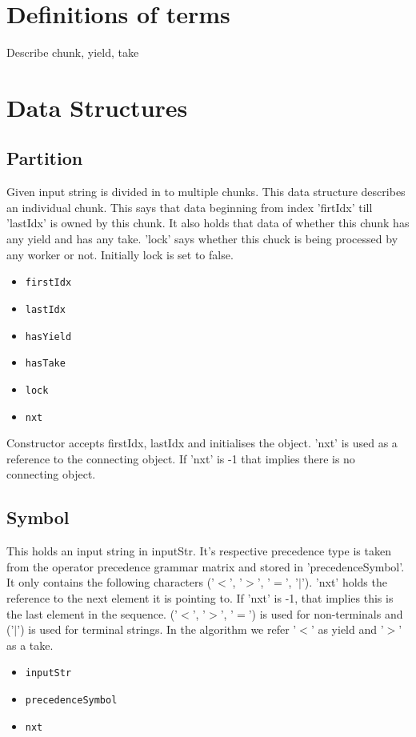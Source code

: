 \documentclass{article}
\begin{document}
 \begin{flushleft}

\section{Definitions of terms}
Describe chunk, yield, take

\section{Data Structures}

\subsection{Partition}

Given input string is divided in to multiple chunks. This data structure describes an individual chunk. This says that data beginning from index 'firtIdx' till 'lastIdx' is owned by this chunk. It also holds that data of whether this chunk has any yield and has any take. 'lock' says whether this chuck is being processed by any worker or not. Initially lock is set to false.
\BlankLine
	\begin{itemize}
		\item \texttt{firstIdx}
		\item \texttt{lastIdx}
		\item \texttt{hasYield}
		\item \texttt{hasTake}
		\item \texttt{lock}
		\item \texttt{nxt}
	\end{itemize}

Constructor accepts firstIdx, lastIdx and initialises the object. 'nxt' is used as a reference to the connecting object. If 'nxt' is -1 that implies there is no connecting object.


\subsection{Symbol}

This holds an input string in inputStr. It's respective precedence type is taken from the operator precedence grammar matrix and stored in 'precedenceSymbol'.  It only contains the following characters ('$<$', '$>$', '$=$', '$|$').  'nxt' holds the reference to the next element it is pointing to. If 'nxt' is -1, that implies this is the last element in the sequence. 
\BlankLine
('$<$', '$>$', '$=$') is used for non-terminals and ('$|$') is used for terminal strings. In the algorithm we refer '$<$' as yield and '$>$' as a take.
\BlankLine
	\begin{itemize}
		\item \texttt{inputStr}
		\item \texttt{precedenceSymbol}
		\item \texttt{nxt}
	\end{itemize}



\end{flushleft}
\end{document}
